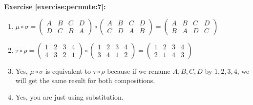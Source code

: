 \noindent\textbf{Exercise \ref{exercise:permute:7}:}
\begin{enumerate}[{a.}]
\item
$\mu\circ\sigma=\begin{pmatrix}
A & B & C & D\\
D & C & B & A
\end{pmatrix}\circ\begin{pmatrix}
A & B & C & D\\
C & D & A & B
\end{pmatrix}=\begin{pmatrix}
A & B & C & D\\
B & A & D & C
\end{pmatrix}$

\item
$\tau\circ\rho=\begin{pmatrix}
1 & 2 & 3 & 4\\
4 & 3 & 2 & 1
\end{pmatrix}\circ\begin{pmatrix}
1 & 2 & 3 & 4\\
3 & 4 & 1 & 2
\end{pmatrix}=\begin{pmatrix}
1 & 2 & 3 & 4\\
2 & 1 & 4 & 3
\end{pmatrix}$

\item
Yes, $\mu\circ\sigma$ is equivalent to $\tau\circ\rho$ because if we rename $A, B, C, D$ by $1, 2, 3, 4$, we will get the same result for both compositions.

\item
Yes, you are just using substitution.
\end{enumerate}


